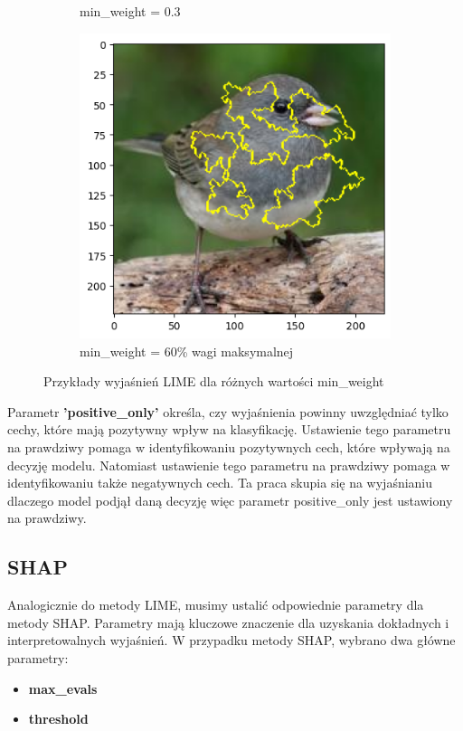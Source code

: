 \begin{figure}[h]
\begin{subfigure}[b]{0.3\textwidth}
		\caption{min\_weight = 0.3}  \label{rys:parameters_lime_numsamples_1000}
	\end{subfigure}
	\begin{subfigure}[b]{0.3\textwidth}
		\includegraphics[width=.9\textwidth]{img/parameters/lime/min_weight_06m}
		\caption{min\_weight = 60\% wagi maksymalnej}  \label{rys:parameters_lime_numsamples_5}
	\end{subfigure}
	\caption{Przykłady wyjaśnień LIME dla różnych wartości min\_weight}
\end{figure}

Parametr \textbf{'positive\_only'} określa, czy wyjaśnienia powinny uwzględniać tylko cechy, które mają pozytywny wpływ na klasyfikację.
Ustawienie tego parametru na prawdziwy pomaga w identyfikowaniu pozytywnych cech, które wpływają na decyzję modelu.
Natomiast ustawienie tego parametru na prawdziwy pomaga w identyfikowaniu także negatywnych cech.
Ta praca skupia się na wyjaśnianiu dlaczego model podjął daną decyzję więc parametr positive\_only jest ustawiony na prawdziwy.


\subsection*{SHAP}
Analogicznie do metody LIME, musimy ustalić odpowiednie parametry dla metody SHAP.
Parametry mają kluczowe znaczenie dla uzyskania dokładnych i interpretowalnych wyjaśnień.
W przypadku metody SHAP, wybrano dwa główne parametry:
\begin{itemize}
	\item \textbf{max\_evals}
	\item \textbf{threshold}
\end{itemize}

